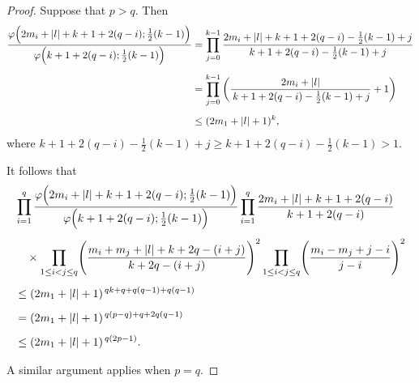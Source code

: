 \documentclass[11pt,a4paper]{amsart}
\theoremstyle{definition}
\numberwithin{equation}{section}
\begin{document}
\begin{proof}
Suppose that \(p > q\). Then
 \begin{align*}
\frac{\varphi\Bigl(2m_i + |l| + k + 1 + 2(q-i);\tfrac{1}{2}(k-1)\Bigr)}
     {\varphi\Bigl(k + 1 + 2(q-i);\tfrac{1}{2}(k-1)\Bigr)}
&= 
\prod_{j=0}^{k-1}
\frac{2m_i+|l|+k+1+2(q-i)-\tfrac{1}{2}(k-1)+j}
     {k+1+2(q-i)-\tfrac{1}{2}(k-1)+j}\\[1ex]
&=
\prod_{j=0}^{k-1}
\left(\frac{2m_i+|l|}{\,k+1+2(q-i)-\tfrac{1}{2}(k-1)+j}+1\right)\\[1ex] 
&\le (2 m_1+|l|+1)^k,
\end{align*}
where $k+1+2(q-i)-\frac{1}{2}(k-1)+j \geq k+1+2(q-i)-\frac{1}{2}(k-1) > 1  $. 


It follows that
\[
\begin{aligned}
&\prod_{i=1}^q \frac{\varphi\Bigl(2m_i + |l| + k + 1 + 2(q-i);\tfrac{1}{2}(k-1)\Bigr)}
                  {\varphi\Bigl(k + 1 + 2(q-i);\tfrac{1}{2}(k-1)\Bigr)}
\prod_{i=1}^q \frac{2m_i+|l|+k+1+2(q-i)}{k+1+2(q-i)}\\[1ex]
&\quad \times \prod_{1\leq i<j\leq q } \Biggl(\frac{m_i+m_j+|l|+k+2q-(i+j)}
      {k+2q-(i+j)}\Biggr)^2
\prod_{1\leq i<j\leq q } \Biggl(\frac{m_i-m_j+j-i}{j-i}\Biggr)^2\\[1ex]
&\le (2m_1+|l|+1)^{\,qk + q + q(q-1) + q(q-1)}\\[1ex]
&= (2m_1+|l|+1)^{\,q(p-q) + q + 2q(q-1)}\\[1ex]
&\le (2m_1+|l|+1)^{\,q(2p-1)}.
\end{aligned}
\]

A similar argument applies when \(p=q\).  
\end{proof}
\end{document}
